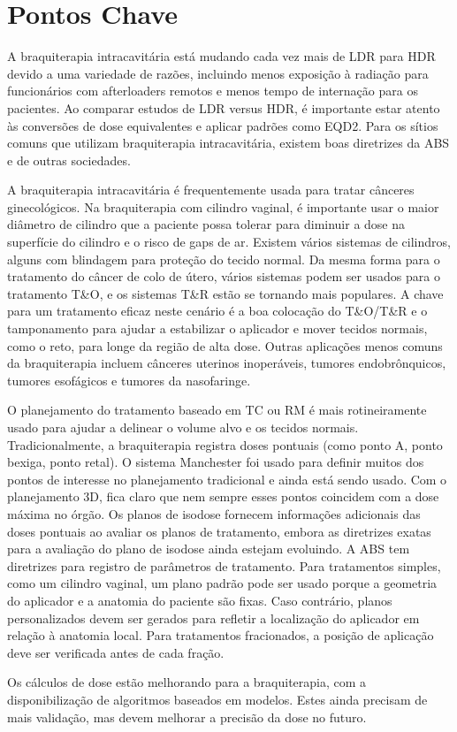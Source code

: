 \documentclass[11pt,a4paper]{article}
\begin{document}
\section{Pontos Chave}

	A braquiterapia intracavitária está mudando cada vez mais de LDR para HDR devido a uma variedade de razões, incluindo menos exposição à radiação para funcionários com afterloaders remotos e menos tempo de internação para os pacientes. Ao comparar estudos de LDR versus HDR, é importante estar atento às conversões de dose equivalentes e aplicar padrões como EQD2. Para os sítios comuns que utilizam braquiterapia intracavitária, existem boas diretrizes da ABS e de outras sociedades.

	A braquiterapia intracavitária é frequentemente usada para tratar cânceres ginecológicos. Na braquiterapia com cilindro vaginal, é importante usar o maior diâmetro de cilindro que a paciente possa tolerar para diminuir a dose na superfície do cilindro e o risco de gaps de ar. Existem vários sistemas de cilindros, alguns com blindagem para proteção do tecido normal. Da mesma forma para o tratamento do câncer de colo de útero, vários sistemas podem ser usados para o tratamento T\&O, e os sistemas T\&R estão se tornando mais populares. A chave para um tratamento eficaz neste cenário é a boa colocação do T\&O/T\&R e o tamponamento para ajudar a estabilizar o aplicador e mover tecidos normais, como o reto, para longe da região de alta dose. Outras aplicações menos comuns da braquiterapia incluem cânceres uterinos inoperáveis, tumores endobrônquicos, tumores esofágicos e tumores da nasofaringe.

	O planejamento do tratamento baseado em TC ou RM é mais rotineiramente usado para ajudar a delinear o volume alvo e os tecidos normais. Tradicionalmente, a braquiterapia registra doses pontuais (como ponto A, ponto bexiga, ponto retal). O sistema Manchester foi usado para definir muitos dos pontos de interesse no planejamento tradicional e ainda está sendo usado. Com o planejamento 3D, fica claro que nem sempre esses pontos coincidem com a dose máxima no órgão. Os planos de isodose fornecem informações adicionais das doses pontuais ao avaliar os planos de tratamento, embora as diretrizes exatas para a avaliação do plano de isodose ainda estejam evoluindo. A ABS tem diretrizes para registro de parâmetros de tratamento. Para tratamentos simples, como um cilindro vaginal, um plano padrão pode ser usado porque a geometria do aplicador e a anatomia do paciente são fixas. Caso contrário, planos personalizados devem ser gerados para refletir a localização do aplicador em relação à anatomia local. Para tratamentos fracionados, a posição de aplicação deve ser verificada antes de cada fração.

	Os cálculos de dose estão melhorando para a braquiterapia, com a disponibilização de algoritmos baseados em modelos. Estes ainda precisam de mais validação, mas devem melhorar a precisão da dose no futuro.






\end{document}
